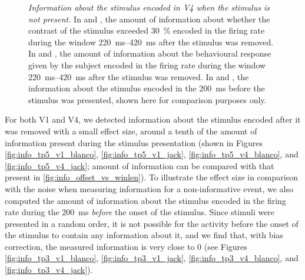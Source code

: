 \begin{figure}[htbp]
    \hspace*{\fill}
    \caption{\textit{Information about the stimulus encoded in \ac{V4} when the stimulus is not present.}
In \protect{} and \protect{}, the amount of information about whether the contrast of the stimulus exceeded \SI{30}{\percent} encoded in the firing rate during the window \SIrange{220}{420}{\milli\second} after the stimulus was removed.
In \protect{} and \protect{}, the amount of information about the behavioural response given by the subject encoded in the firing rate during the window \SIrange{220}{420}{\milli\second} after the stimulus was removed.
In \protect{} and \protect{}, the information about the stimulus encoded in the \SI{200}{\milli\second} before the stimulus was presented, shown here for comparison purposes only.
    \label{fig:info_tp5_v4}
}
\end{figure}


For both \ac{V1} and \ac{V4}, we detected information about the stimulus encoded after it was removed with a small effect size, around a tenth of the amount of information present during the stimulus presentation (shown in Figures \ref{fig:info_tp5_v1_blanco}, \ref{fig:info_tp5_v1_jack}, \ref{fig:info_tp5_v4_blanco}, and \ref{fig:info_tp5_v4_jack}; amount of information can be compared with that present in \autoref{fig:info_offset_vs_winlen}).
To illustrate the effect size in comparison with the noise when measuring information for a non-informative event, we also computed the amount of information about the stimulus encoded in the firing rate during the \SI{200}{\milli\second} \textit{before} the onset of the stimulus.
Since stimuli were presented in a random order, it is not possible for the activity before the onset of the stimulus to contain any information about it, and we find that, with bias correction, the measured information is very close to \num{0} (see Figures \ref{fig:info_tp3_v1_blanco}, \ref{fig:info_tp3_v1_jack}, \ref{fig:info_tp3_v4_blanco}, and \ref{fig:info_tp3_v4_jack}).

